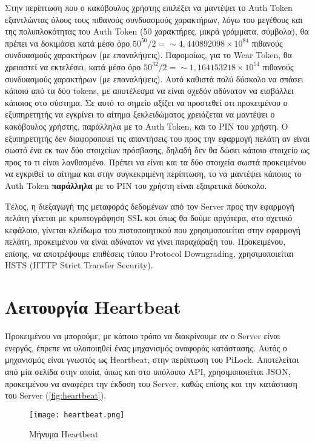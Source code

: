 		Στην περίπτωση που ο κακόβουλος χρήστης επιλέξει να μαντέψει το Auth Token εξαντλώντας όλους τους πιθανούς συνδυασμούς χαρακτήρων, λόγω του μεγέθους και της πολυπλοκότητας του Auth Token (50 χαρακτήρες, μικρά γράμματα, σύμβολα), θα πρέπει να δοκιμάσει κατά μέσο όρο \(50^{50}/2=\sim4,440892098×10^{84}\) πιθανούς συνδυασμούς χαρακτήρων (με επαναλήψεις). Παρομοίως, για το Wear Token, θα χρειαστεί να εκτελέσει, κατά μέσο όρο \(50^{32}/2=\sim1,164153218×10^{54}\) πιθανούς συνδυασμούς χαρακτήρων (με επαναλήψεις). Αυτό καθιστά πολύ δύσκολο να σπάσει κάποιο από τα δύο tokens, με αποτέλεσμα να είναι σχεδόν αδύνατον να εισβάλλει κάποιος στο σύστημα. Σε αυτό το σημείο αξίζει να προστεθεί οτι προκειμένου ο εξυπηρετητής να εγκρίνει το αίτημα ξεκλειδώματος χρειάζεται να μαντέψει ο κακόβουλος χρήστης, παράλληλα με το Auth Token, και το PIN του χρήστη. Ο εξυπηρετητής δεν διαφοροποιεί τις απαντήσεις του προς την εφαρμογή πελάτη αν είναι σωστό ένα εκ των δύο στοιχείων πρόσβασης, δηλαδή δεν θα δώσει κάποιο στοιχείο ως προς το τι είναι λανθασμένο. Πρέπει να είναι και τα δύο στοιχεία σωστά προκειμένου να εγκριθεί το αίτημα και στην συγκεκριμένη περίπτωση, το να μαντέψει κάποιος το Auth Token \textbf{παράλληλα} με το PIN του χρήστη είναι εξαιρετικά δύσκολο.

		Τέλος, η διεξαγωγή της μεταφοράς δεδομένων από τον Server προς την εφαρμογή πελάτη γίνεται με κρυπτογράφηση SSL και όπως θα δούμε αργότερα, στο σχετικό κεφάλαιο, γίνεται κλείδωμα του πιστοποιητικού που χρησιμοποιείται στην εφαρμογή πελάτη, προκειμένου να είναι αδύνατον να γίνει παραχάραξη του. Προκειμένου, επίσης, να αποτρέψουμε επιθέσεις τύπου Protocol Downgrading, χρησιμοποιείται HSTS (HTTP Strict Transfer Security). 

\section{Λειτουργία Heartbeat}
	\label{sec:heartbeat}
	Προκειμένου να μπορούμε, με κάποιο τρόπο να διακρίνουμε αν ο Server είναι ενεργός, έπρεπε να υλοποιηθεί ένας μηχανισμός αναφοράς κατάστασης. Αυτός ο μηχανισμός είναι γνωστός ως Heartbeat, στην περίπτωση του PiLock. Αποτελείται από μία σελίδα στην οποία, όπως και στο υπόλοιπο API, χρησιμοποιείται JSON, προκειμένου να αναφέρει την έκδοση του Server, καθώς επίσης και την κατάσταση του Server (\autoref{fig:heartbeat}). 

	\begin{figure}[h]
	\centering
		\texttt{[image: heartbeat.png]}
	\caption{Μήνυμα Heartbeat}
	\label{fig:heartbeat}
	\end{figure}

